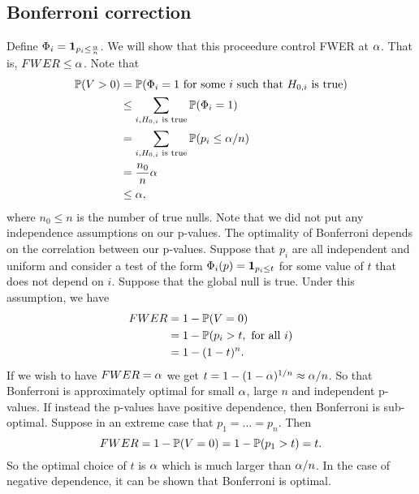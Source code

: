 \subsection{Bonferroni correction}
Define $\Phi_i = {{\bf 1}}_{p_i \le \frac{{\alpha}}{n}}$. We will show that this proceedure control FWER at ${\alpha}$. That is, $FWER \le {\alpha}$. Note that
\begin{align*}
    {\mathbb{P}}(V > 0)&={\mathbb{P}}(\Phi_i = 1 \text{ for some } i \text{ such that $H_{0,i}$ is true})\\
    &\le \sum_{i, H_{0,i} \text{ is true}}{\mathbb{P}}(\Phi_i = 1)\\
    &= \sum_{i, H_{0,i} \text{ is true}}{\mathbb{P}}(p_i \le {\alpha}/n)\\
    &= \frac{n_0}{n}{\alpha}\\
    &\le {\alpha},
\end{align*}
where $n_0 \le n$ is the number of true nulls. Note that we did not put any independence assumptions on our p-values. The optimality of Bonferroni depends on the correlation between our p-values. Suppose that $p_i$ are all independent and uniform and consider a test of the form $\Phi_i(p) = {{\bf 1}}_{p_i \le t}$ for some value of $t$ that does not depend on $i$. Suppose that the global null is true. Under this assumption, we have
\begin{align*}
    FWER &= 1-{\mathbb{P}}(V=0)\\
    &=1-{\mathbb{P}}(p_i > t, \text{ for all } i)\\
    &=1-(1-t)^n.
\end{align*}
If we wish to have $FWER={\alpha}$ we get $t = 1-(1-{\alpha})^{1/n}\approx {\alpha}/n$. So that Bonferroni is approximately optimal for small ${\alpha}$, large $n$ and independent p-values. If instead the p-values have positive dependence, then Bonferroni is sub-optimal. Suppose in an extreme case that $p_1=\ldots =p_n$. Then
\[FWER = 1-{\mathbb{P}}(V=0)=1-{\mathbb{P}}(p_1 > t) =t.\]
So the optimal choice of $t$ is ${\alpha}$ which is much larger than ${\alpha}/n$. In the case of negative dependence, it can be shown that Bonferroni is optimal.
